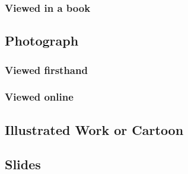 \documentclass{article}
\begin{document}
\subsubsection{Viewed in a book} %
\label{ssub:painting_viewed_in_a_book}
\begin{refsection}\citereset
	\printbibliography[heading=none]
\end{refsection}
\subsection{Photograph} %
\label{sub:photograph}
\subsubsection{Viewed firsthand} %
\label{ssub:photo_viewed_firsthand}
\begin{refsection}
	\printbibliography[heading=none]
\end{refsection}
\subsubsection{Viewed online} %
\label{ssub:photo_viewed_online}
\begin{refsection}
	\printbibliography[heading=none]
\end{refsection}
\subsection{Illustrated Work or Cartoon} %
\label{sub:illustrated_work_or_cartoon}
\begin{refsection}
	\printbibliography[heading=none]
\end{refsection}
\subsection{Slides} %
\label{sub:slides}
\begin{refsection}
	\printbibliography[heading=none]
\end{refsection}
\end{document}
